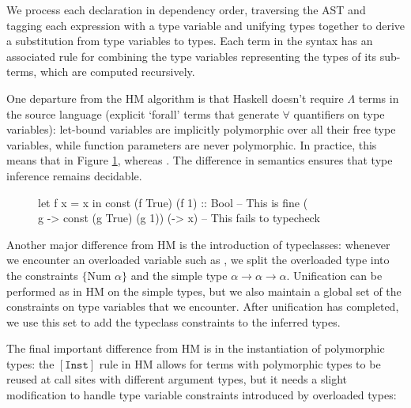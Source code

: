 \documentclass[dissertation.tex]{subfiles}
\begin{document}
{{{            We process each declaration in dependency order, traversing the AST and tagging each expression with a type
            variable and unifying types together to derive a substitution from type variables to types. Each term in the
            syntax has an associated rule for combining the type variables representing the types of its sub-terms,
            which are computed recursively.

            One departure from the HM algorithm is that Haskell doesn't require \(\Lambda\) terms in the source language
            (explicit `forall' terms that generate \(\forall\) quantifiers on type variables): let-bound variables are
            implicitly polymorphic over all their free type variables, while function parameters are never polymorphic.
            In practice, this means that in Figure \ref{code:polymorphic-let},  whereas . The difference in semantics
            ensures that type inference remains decidable.
 
            \begin{figure}[h]
            \begin{haskellfigure}
            let f x = x in const (f True) (f 1) :: Bool -- This is fine
            (\\g -> const (g True) (g 1)) (\x -> x)     -- This fails to typecheck
            \end{haskellfigure}
            \caption{}
            \label{code:polymorphic-let}
            \end{figure}
            
            Another major difference from HM is the introduction of typeclasses: whenever we encounter an overloaded
            variable such as \haskell{+}, we split the overloaded type into the constraints \(\{\text{Num }\alpha\}\)
            and the simple type \(\alpha\rightarrow\alpha\rightarrow\alpha\). Unification can be performed as in HM on
            the simple types, but we also maintain a global set of the constraints on type variables that we encounter.
            After unification has completed, we use this set to add the typeclass constraints to the inferred types.

            The final important difference from HM is in the instantiation of polymorphic types: the \([\texttt{Inst}]\)
            rule in HM allows for terms with polymorphic types to be reused at call sites with different argument types,
            but it needs a slight modification to handle type variable constraints introduced by overloaded types:
            
}}}
\end{document}
